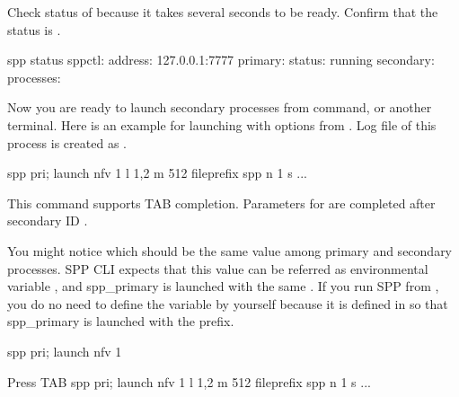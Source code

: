 \documentclass[a4paper,11pt,openany,oneside,english]{sphinxmanual}
\begin{document}
Check status of  because it takes several seconds to be ready.
Confirm that the status is .

\begin{sphinxVerbatim}[commandchars=\\\{\},formatcom=\footnotesize]
spp \PYGZgt{} status
\PYGZhy{} spp\PYGZhy{}ctl:
  \PYGZhy{} address: 127.0.0.1:7777
\PYGZhy{} primary:
  \PYGZhy{} status: running
\PYGZhy{} secondary:
  \PYGZhy{} processes:
\end{sphinxVerbatim}

Now you are ready to launch secondary processes from 
command, or another terminal. Here is an example for launching 
with options from .
Log file of this process is created as .

\begin{sphinxVerbatim}[commandchars=\\\{\},formatcom=\footnotesize]
spp \PYGZgt{} pri; launch nfv 1 \PYGZhy{}l 1,2 \PYGZhy{}m 512 \PYGZhy{}\PYGZhy{}file\PYGZhy{}prefix spp \PYGZhy{}\PYGZhy{} \PYGZhy{}n 1 \PYGZhy{}s ...
\end{sphinxVerbatim}

This  command supports TAB completion. Parameters for 
are completed after secondary ID .

You might notice  which should be the same value among
primary and secondary processes. SPP CLI expects that this value can be
referred as environmental variable , and spp\_primary is
launched with the same .
If you run SPP from , you do no need to define the variable
by yourself because it is defined in  so that spp\_primary is
launched with the prefix.

\begin{sphinxVerbatim}[commandchars=\\\{\},formatcom=\footnotesize]
spp \PYGZgt{} pri; launch nfv 1

\PYGZsh{} Press TAB
spp \PYGZgt{} pri; launch nfv 1 \PYGZhy{}l 1,2 \PYGZhy{}m 512 \PYGZhy{}\PYGZhy{}file\PYGZhy{}prefix spp \PYGZhy{}\PYGZhy{} \PYGZhy{}n 1 \PYGZhy{}s ...
\end{sphinxVerbatim}
\end{document}
